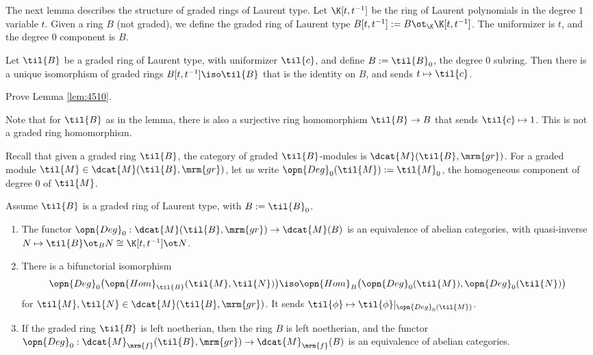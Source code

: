 The next lemma describes the structure of graded rings of Laurent type. 
Let $\K[t, t^{-1}]$ be the ring of Laurent polynomials in the degree $1$ 
variable $t$. Given a ring $B$ (not graded), we define the graded ring of 
Laurent type 
$B[t, t^{-1}] := B \ot_{\K} \K[t, t^{-1}]$.
The uniformizer is $t$, and the degree $0$ component is $B$.  

\begin{lem} \label{lem:4510}
Let $\til{B}$ be a graded ring of Laurent type, with uniformizer $\til{c}$, and 
define $B := \til{B}_0$, the degree $0$ subring.
Then there is a unique isomorphism of graded rings 
$B[t, t^{-1}] \iso \til{B}$ 
that is the identity on $B$, and  sends $t \mapsto \til{c}$.
\end{lem}

\begin{exer} \label{exer:4511}
Prove Lemma \ref{lem:4510}.
\end{exer}

Note that for $\til{B}$ as in the lemma, there is also a surjective ring 
homomorphism $\til{B} \to B$ that sends $\til{c} \mapsto 1$. This is not a 
graded ring homomorphism. 

Recall that given a graded ring $\til{B}$, the category of graded 
$\til{B}$-modules is $\dcat{M}(\til{B}, \mrm{gr})$.
For a graded module $\til{M} \in \dcat{M}(\til{B}, \mrm{gr})$,
let us write 
$\opn{Deg}_0(\til{M}) := \til{M}_0$,
the homogeneous component of degree $0$ of $\til{M}$. 

\begin{lem} \label{lem:4390}
Assume $\til{B}$ is a graded ring of Laurent type, with $B := \til{B}_0$. 
\begin{enumerate}
\item The functor 
$\opn{Deg}_0 : \dcat{M}(\til{B}, \mrm{gr}) \to \dcat{M}(B)$
is an equivalence of abelian categories, with quasi-inverse 
$N \mapsto \til{B} \ot_{B} N \cong \K[t, t^{-1}] \ot N$.

\item There is a bifunctorial isomorphism 
\[ \opn{Deg}_0 \bigl( \opn{Hom}_{\til{B}}(\til{M} , \til{N}) \bigr) \iso 
\opn{Hom}_{B} \bigl( \opn{Deg}_0(\til{M}), \opn{Deg}_0(\til{N}) \bigr) \]
for $\til{M} , \til{N} \in \dcat{M}(\til{B}, \mrm{gr})$. It sends 
$\til{\phi} \mapsto \til{\phi}|_{\opn{Deg}_0(\til{M})}$.

\item If the graded ring $\til{B}$ is left noetherian, then the ring 
$B$ is left noetherian, and the functor 
$\opn{Deg}_0 : \dcat{M}_{\mrm{f}}(\til{B}, \mrm{gr}) \to 
\dcat{M}_{\mrm{f}}(B)$
is an equivalence  of abelian categories. 
\end{enumerate}
\end{lem}

